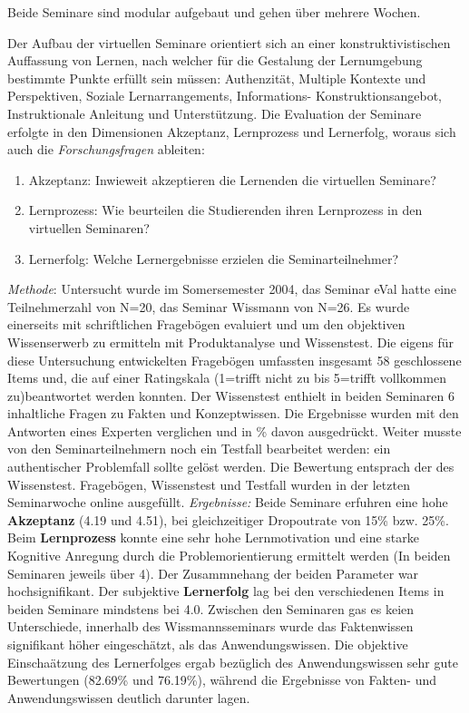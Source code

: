 \documentclass[12pt, bibliography=totoc]{scrartcl}
\begin{document}
Beide Seminare sind modular aufgebaut und gehen über mehrere Wochen.

Der Aufbau der virtuellen Seminare orientiert sich an einer
konstruktivistischen Auffassung von Lernen, nach welcher für die
Gestalung der Lernumgebung bestimmte Punkte erfüllt sein müssen:
Authenzität, Multiple Kontexte und Perspektiven, Soziale
Lernarrangements, Informations- Konstruktionsangebot, Instruktionale
Anleitung und Unterstützung. Die Evaluation der Seminare erfolgte in den
Dimensionen Akzeptanz, Lernprozess und Lernerfolg, woraus sich auch die
\emph{Forschungsfragen} ableiten:

\begin{enumerate}
\def\labelenumi{\arabic{enumi}.}
\itemsep1pt\parskip0pt
\item
  Akzeptanz: Inwieweit akzeptieren die Lernenden die virtuellen
  Seminare?
\item
  Lernprozess: Wie beurteilen die Studierenden ihren Lernprozess in den
  virtuellen Seminaren?
\item
  Lernerfolg: Welche Lernergebnisse erzielen die Seminarteilnehmer?
\end{enumerate}

\emph{Methode}: Untersucht wurde im Somersemester 2004, das Seminar eVal
hatte eine Teilnehmerzahl von N=20, das Seminar Wissmann von N=26. Es
wurde einerseits mit schriftlichen Fragebögen evaluiert und um den
objektiven Wissenserwerb zu ermitteln mit Produktanalyse und
Wissenstest. Die eigens für diese Untersuchung entwickelten Fragebögen
umfassten insgesamt 58 geschlossene Items und, die auf einer Ratingskala
(1=trifft nicht zu bis 5=trifft vollkommen zu)beantwortet werden
konnten. Der Wissenstest enthielt in beiden Seminaren 6 inhaltliche
Fragen zu Fakten und Konzeptwissen. Die Ergebnisse wurden mit den
Antworten eines Experten verglichen und in \% davon ausgedrückt. Weiter
musste von den Seminarteilnehmern noch ein Testfall bearbeitet werden:
ein authentischer Problemfall sollte gelöst werden. Die Bewertung
entsprach der des Wissenstest. Fragebögen, Wissenstest und Testfall
wurden in der letzten Seminarwoche online ausgefüllt. \emph{Ergebnisse:}
Beide Seminare erfuhren eine hohe \textbf{Akzeptanz} (4.19 und 4.51),
bei gleichzeitiger Dropoutrate von 15\% bzw. 25\%. Beim
\textbf{Lernprozess} konnte eine sehr hohe Lernmotivation und eine
starke Kognitive Anregung durch die Problemorientierung ermittelt werden
(In beiden Seminaren jeweils über 4). Der Zusammnehang der beiden
Parameter war hochsignifikant. Der subjektive \textbf{Lernerfolg} lag
bei den verschiedenen Items in beiden Seminare mindstens bei 4.0.
Zwischen den Seminaren gas es keien Unterschiede, innerhalb des
Wissmannsseminars wurde das Faktenwissen signifikant höher eingeschätzt,
als das Anwendungswissen. Die objektive Einschaätzung des Lernerfolges
ergab bezüglich des Anwendungswissen sehr gute Bewertungen (82.69\% und
76.19\%), während die Ergebnisse von Fakten- und Anwendungswissen
deutlich darunter lagen.
\end{document}
